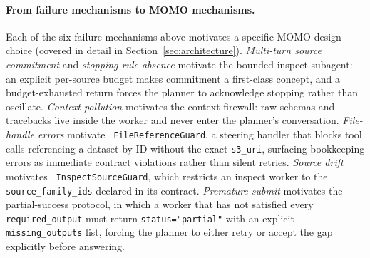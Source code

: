 \paragraph{From failure mechanisms to MOMO mechanisms.} Each of the six failure mechanisms above motivates a specific MOMO design choice (covered in detail in Section~\ref{sec:architecture}). \emph{Multi-turn source commitment} and \emph{stopping-rule absence} motivate the bounded inspect subagent: an explicit per-source budget makes commitment a first-class concept, and a budget-exhausted return forces the planner to acknowledge stopping rather than oscillate. \emph{Context pollution} motivates the context firewall: raw schemas and tracebacks live inside the worker and never enter the planner's conversation. \emph{File-handle errors} motivate \texttt{\_FileReferenceGuard}, a steering handler that blocks tool calls referencing a dataset by ID without the exact \texttt{s3\_uri}, surfacing bookkeeping errors as immediate contract violations rather than silent retries. \emph{Source drift} motivates \texttt{\_InspectSourceGuard}, which restricts an inspect worker to the \texttt{source\_family\_ids} declared in its contract. \emph{Premature submit} motivates the partial-success protocol, in which a worker that has not satisfied every \texttt{required\_output} must return \texttt{status="partial"} with an explicit \texttt{missing\_outputs} list, forcing the planner to either retry or accept the gap explicitly before answering.

